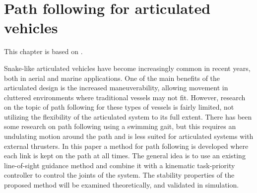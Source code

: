 \documentclass[../main.tex]{subfiles}
\begin{document}

\chapter{Path following for articulated vehicles}

This chapter is based on \cite{saebo2024}.





Snake-like articulated vehicles have become increasingly common in recent years, both in aerial and marine applications. One of the main benefits of the articulated design is the increased maneuverability, allowing movement in cluttered environments where traditional vessels may not fit. However, research on the topic of path following for these types of vessels is fairly limited, not utilizing the flexibility of the articulated system to its full extent. There has been some research on path following using a swimming gait, but this requires an undulating motion around the path and is less suited for articulated systems with external thrusters. In this paper a method for path following is developed where each link is kept on the path at all times. The general idea is to use an existing line-of-sight guidance method and combine it with a kinematic task-priority controller to control the joints of the system. The stability properties of the proposed method will be examined theoretically, and validated in simulation.

\end{document}
